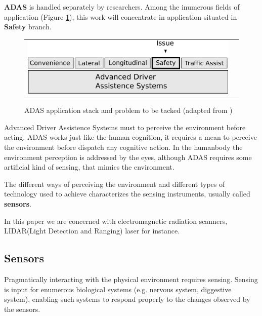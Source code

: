 \textbf{ADAS} is handled separately by researchers. Among the inumerous fields of application (Figure \ref{fig:sensor:target}), this work will concentrate in application situated in \textbf{Safety} branch.

\begin{figure}[h]
\centering
	\begin{tabular}{lr}\\
		\includegraphics[scale=0.7]{img/fig:sensor:target} 
	\end{tabular}
	\caption{ADAS application stack and problem to be tacked (adapted from \cite{riener2010sensor})}
	\label{fig:sensor:target}
\end{figure}

Advanced Driver Assistence Systems must to perceive the environment before acting. ADAS works just like the human cognition, it requires a mean to perceive the environment before dispatch any cognitive action. In the humanbody the environment perception is addressed by the eyes, although ADAS requires some artificial kind of sensing, that mimics the environment. 

The different ways of perceiving the environment and different types of technology used to achieve characterizes the sensing instruments, usually called \textbf{sensors}.


In this paper we are concerned with electromagnetic radiation scanners, LIDAR(Light Detection and Ranging) laser for instance.

\subsection{Sensors}


Pragmatically interacting with the physical environment requires sensing. Sensing is input for enumerous biological systems (e.g. nervous system, diggestive system), enabling such systems to respond properly to the changes observed by the sensors. 

